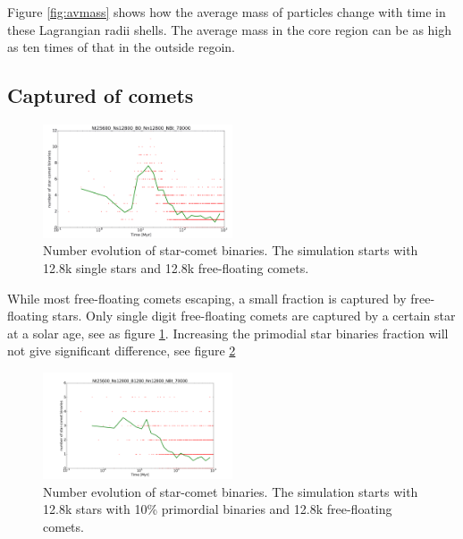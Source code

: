 \documentclass[usenatbib]{mnras}
\begin{document}
Figure  \ref{fig:avmass} shows how the average mass of particles change with time in these Lagrangian radii shells. The average mass in the core region can be as high as ten times of that in the outside regoin.




\subsection{Captured of comets}

\begin{figure}
  \centering
  \includegraphics[width=0.5\textwidth,height=!]{Ns_c.png}
  \caption{Number evolution of star-comet binaries. The simulation starts with 12.8k single stars and 12.8k free-floating comets.}
  \label{fig:Ns_c}
\end{figure}

While most free-floating comets escaping, a small fraction is captured by free-floating stars. Only single digit free-floating comets are captured by a certain star at a solar age, see as figure \ref{fig:Ns_c}. Increasing the primodial star binaries fraction will not give significant difference, see figure \ref{fig:Ns_c10}
\begin{figure}
  \centering
  \includegraphics[width=0.5\textwidth,height=!]{Ns_c10}
  \caption{Number evolution of star-comet binaries. The simulation starts with 12.8k stars with 10\% primordial binaries and 12.8k free-floating comets.}
  \label{fig:Ns_c10}
\end{figure}
\end{document}
